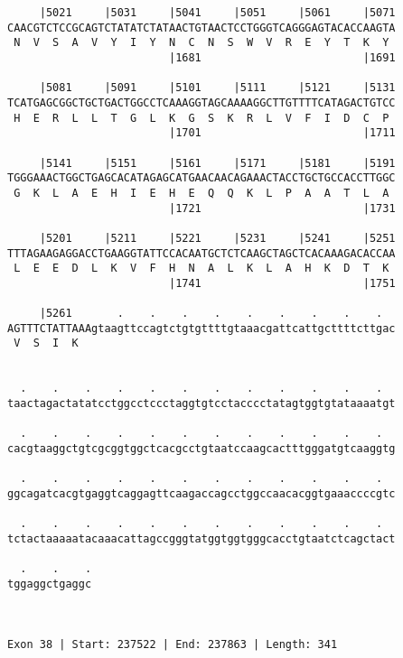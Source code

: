 \documentclass{article}
\begin{document}
\begin{Verbatim}
     |5021     |5031     |5041     |5051     |5061     |5071
CAACGTCTCCGCAGTCTATATCTATAACTGTAACTCCTGGGTCAGGGAGTACACCAAGTA
 N  V  S  A  V  Y  I  Y  N  C  N  S  W  V  R  E  Y  T  K  Y 
                         |1681                         |1691
  
     |5081     |5091     |5101     |5111     |5121     |5131
TCATGAGCGGCTGCTGACTGGCCTCAAAGGTAGCAAAAGGCTTGTTTTCATAGACTGTCC
 H  E  R  L  L  T  G  L  K  G  S  K  R  L  V  F  I  D  C  P 
                         |1701                         |1711
  
     |5141     |5151     |5161     |5171     |5181     |5191
TGGGAAACTGGCTGAGCACATAGAGCATGAACAACAGAAACTACCTGCTGCCACCTTGGC
 G  K  L  A  E  H  I  E  H  E  Q  Q  K  L  P  A  A  T  L  A 
                         |1721                         |1731
  
     |5201     |5211     |5221     |5231     |5241     |5251
TTTAGAAGAGGACCTGAAGGTATTCCACAATGCTCTCAAGCTAGCTCACAAAGACACCAA
 L  E  E  D  L  K  V  F  H  N  A  L  K  L  A  H  K  D  T  K 
                         |1741                         |1751
  
     |5261       .    .    .    .    .    .    .    .    .  
AGTTTCTATTAAAgtaagttccagtctgtgttttgtaaacgattcattgcttttcttgac
 V  S  I  K                                                 
                                                            
  
  .    .    .    .    .    .    .    .    .    .    .    .  
taactagactatatcctggcctccctaggtgtcctacccctatagtggtgtataaaatgt
                                                            
  .    .    .    .    .    .    .    .    .    .    .    .  
cacgtaaggctgtcgcggtggctcacgcctgtaatccaagcactttgggatgtcaaggtg
                                                            
  .    .    .    .    .    .    .    .    .    .    .    .  
ggcagatcacgtgaggtcaggagttcaagaccagcctggccaacacggtgaaaccccgtc
                                                            
  .    .    .    .    .    .    .    .    .    .    .    .  
tctactaaaaatacaaacattagccgggtatggtggtgggcacctgtaatctcagctact
                                                            
  .    .    .
tggaggctgaggc
             
             
 
Exon 38 | Start: 237522 | End: 237863 | Length: 341




\end{Verbatim}
\end{document}
